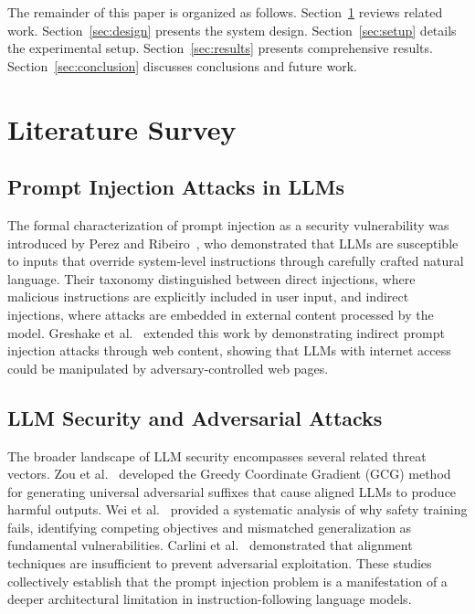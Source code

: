 \documentclass[11pt]{article}
\begin{document}
The remainder of this paper is organized as follows. Section~\ref{sec:litsurvey} reviews related work. Section~\ref{sec:design} presents the system design. Section~\ref{sec:setup} details the experimental setup. Section~\ref{sec:results} presents comprehensive results. Section~\ref{sec:conclusion} discusses conclusions and future work.

\section{Literature Survey}
\label{sec:litsurvey}

\subsection{Prompt Injection Attacks in LLMs}

The formal characterization of prompt injection as a security vulnerability was introduced by Perez and Ribeiro~\cite{perez2022ignore}, who demonstrated that LLMs are susceptible to inputs that override system-level instructions through carefully crafted natural language. Their taxonomy distinguished between direct injections, where malicious instructions are explicitly included in user input, and indirect injections, where attacks are embedded in external content processed by the model. Greshake et al.~\cite{greshake2023not} extended this work by demonstrating indirect prompt injection attacks through web content, showing that LLMs with internet access could be manipulated by adversary-controlled web pages.

\subsection{LLM Security and Adversarial Attacks}

The broader landscape of LLM security encompasses several related threat vectors. Zou et al.~\cite{zou2023universal} developed the Greedy Coordinate Gradient (GCG) method for generating universal adversarial suffixes that cause aligned LLMs to produce harmful outputs. Wei et al.~\cite{wei2023jailbroken} provided a systematic analysis of why safety training fails, identifying competing objectives and mismatched generalization as fundamental vulnerabilities. Carlini et al.~\cite{carlini2023aligned} demonstrated that alignment techniques are insufficient to prevent adversarial exploitation. These studies collectively establish that the prompt injection problem is a manifestation of a deeper architectural limitation in instruction-following language models.
\end{document}
